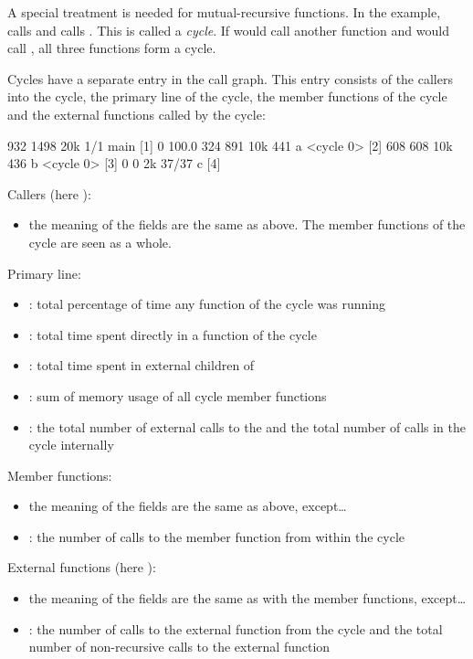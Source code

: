 A special treatment is needed for mutual-recursive functions. In the example,
 calls  and  calls . This is called a \textit{cycle}.
If  would call another function  and  would call , all three
functions form a cycle.

Cycles have a separate entry in the call graph.
This entry consists of the callers into the cycle, the primary line of the cycle,
the member functions of the cycle and the external functions called by the cycle:

\begin{example}
            932   1498  20k      1/1      main [1]
 0  100.0%
            324    891  10k      441      a <cycle 0> [2]
            608    608  10k      436      b <cycle 0> [3]
              0      0   2k    37/37      c [4]
\end{example}

Callers (here ):
\begin{itemize}
	\item the meaning of the fields are the same
	as above. The member functions of the cycle are seen as a whole.
\end{itemize}

Primary line:
\begin{itemize}
	\item {}:
		total percentage of time any function of the cycle was running
	\item {}:
		total time spent directly in a function of the cycle
	\item {}:
		total time spent in external children of 
	\item {}:
		sum of memory usage of all cycle member functions
	\item {}:
		the total number of external calls to the  and the total number
		of calls in the cycle internally
\end{itemize}

Member functions:
\begin{itemize}
	\item the meaning of the fields are the same as above, except\ldots
	\item {}: the number of calls to the member function from within the cycle
\end{itemize}

External functions (here ):
\begin{itemize}
	\item the meaning of the fields are the same as with the member functions, except\ldots
	\item {}: the number of calls to the external function from the cycle
		and
		the total number of non-recursive calls to the external function
\end{itemize}


